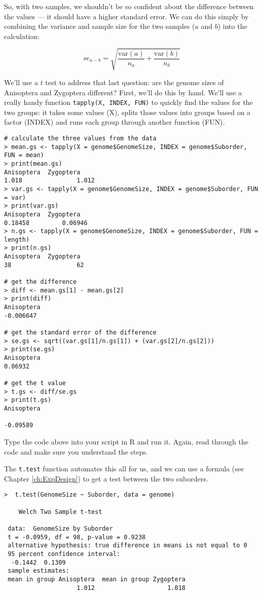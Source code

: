 So, with two samples, we shouldn't be so confident about the difference 
between the values --- it should have a higher standard error. We can 
do this simply by combining the variance and sample size for the two 
samples ($a$ and $b$) into the calculation:

\[
se_{a-b}= \sqrt{\frac{\textrm{var}(a)}{n_a} + \frac{\textrm{var}(b)}{n_b}}
\]

We'll use a $t$ test to address that last question: are the genome 
sizes of Anisoptera and Zygoptera different? First, we'll do this by 
hand. We'll use a really handy function {\tt tapply(X, INDEX, FUN)} to 
quickly find the values for the two groups: it takes some values (X), 
splits those values into groups based on a factor (INDEX) and runs each 
group through another function (FUN). 

\begin{lstlisting}
# calculate the three values from the data
> mean.gs <- tapply(X = genome$GenomeSize, INDEX = genome$Suborder, FUN = mean)
> print(mean.gs)
Anisoptera 	Zygoptera
1.018				1.012
> var.gs <- tapply(X = genome$GenomeSize, INDEX = genome$Suborder, FUN = var)
> print(var.gs)
Anisoptera 	Zygoptera
0.18458 		0.06946
> n.gs <- tapply(X = genome$GenomeSize, INDEX = genome$Suborder, FUN = length)
> print(n.gs)
Anisoptera 	Zygoptera
38					62

# get the difference
> diff <- mean.gs[1] - mean.gs[2]
> print(diff)
Anisoptera
-0.006647

# get the standard error of the difference
> se.gs <- sqrt((var.gs[1]/n.gs[1]) + (var.gs[2]/n.gs[2]))
> print(se.gs)
Anisoptera
0.06932

# get the t value
> t.gs <- diff/se.gs
> print(t.gs)
Anisoptera

-0.09589

\end{lstlisting}
 
\begin{compactitem}[$\quad\star$]
\item Type the code above into your script in R and run it. Again, read 
through the code and make sure you understand the steps.
\end{compactitem}

The {\tt t.test} function automates this all for us, and we can use a 
formula (see Chapter \ref{ch:ExpDesign}) to get a test between the two 
suborders.

\begin{lstlisting}
>  t.test(GenomeSize ~ Suborder, data = genome)
 
 	Welch Two Sample t-test
 
 data:  GenomeSize by Suborder 
 t = -0.0959, df = 98, p-value = 0.9238
 alternative hypothesis: true difference in means is not equal to 0 
 95 percent confidence interval:
  -0.1442  0.1309 
 sample estimates:
 mean in group Anisoptera  mean in group Zygoptera 
                    1.012                    1.018 
 
\end{lstlisting}
 
